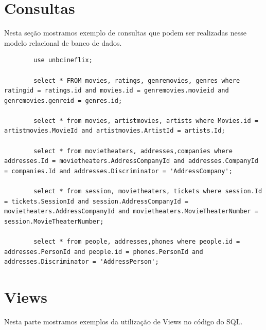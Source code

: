 \documentclass[a4paper,10pt]{article}
\begin{document}
\section{Consultas}

Nesta seção mostramos exemplo de consultas que podem ser realizadas nesse modelo relacional de banco de dados.

\begin{lstlisting}
		use unbcineflix;
		
		select * FROM movies, ratings, genremovies, genres where ratingid = ratings.id and movies.id = genremovies.movieid and genremovies.genreid = genres.id;
		
		select * from movies, artistmovies, artists where Movies.id = artistmovies.MovieId and artistmovies.ArtistId = artists.Id;
		
		select * from movietheaters, addresses,companies where addresses.Id = movietheaters.AddressCompanyId and addresses.CompanyId = companies.Id and addresses.Discriminator = 'AddressCompany';
		
		select * from session, movietheaters, tickets where session.Id = tickets.SessionId and session.AddressCompanyId = movietheaters.AddressCompanyId and movietheaters.MovieTheaterNumber = session.MovieTheaterNumber;
		
		select * from people, addresses,phones where people.id = addresses.PersonId and people.id = phones.PersonId and addresses.Discriminator = 'AddressPerson';
\end{lstlisting}


\section{Views}

Nesta parte mostramos exemplos da utilização de Views no código do SQL.
\end{document}
